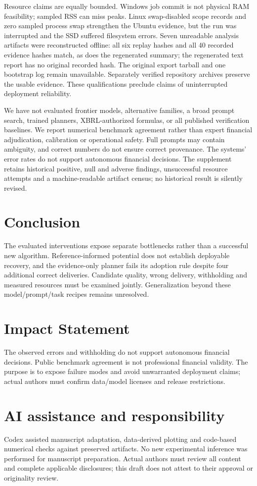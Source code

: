 \documentclass{article}
\begin{document}
Resource claims are equally bounded. Windows job commit is not physical RAM feasibility; sampled RSS can miss peaks. Linux swap-disabled scope records and zero sampled process swap strengthen the Ubuntu evidence, but the run was interrupted and the SSD suffered filesystem errors. Seven unreadable analysis artifacts were reconstructed offline: all six replay hashes and all 40 recorded evidence hashes match, as does the regenerated summary; the regenerated text report has no original recorded hash. The original export tarball and one bootstrap log remain unavailable. Separately verified repository archives preserve the usable evidence. These qualifications preclude claims of uninterrupted deployment reliability.

We have not evaluated frontier models, alternative families, a broad prompt search, trained planners, XBRL-authorized formulas, or all published verification baselines. We report numerical benchmark agreement rather than expert financial adjudication, calibration or operational safety. Full prompts may contain ambiguity, and correct numbers do not ensure correct provenance. The systems' error rates do not support autonomous financial decisions. The supplement retains historical positive, null and adverse findings, unsuccessful resource attempts and a machine-readable artifact census; no historical result is silently revised.

\section{Conclusion}The evaluated interventions expose separate bottlenecks rather than a successful new algorithm. Reference-informed potential does not establish deployable recovery, and the evidence-only planner fails its adoption rule despite four additional correct deliveries. Candidate quality, wrong delivery, withholding and measured resources must be examined jointly. Generalization beyond these model/prompt/task recipes remains unresolved.

\section*{Impact Statement}
The observed errors and withholding do not support autonomous financial decisions. Public benchmark agreement is not professional financial validity. The purpose is to expose failure modes and avoid unwarranted deployment claims; actual authors must confirm data/model licenses and release restrictions.
\section*{AI assistance and responsibility}
Codex assisted manuscript adaptation, data-derived plotting and code-based numerical checks against preserved artifacts. No new experimental inference was performed for manuscript preparation. Actual authors must review all content and complete applicable disclosures; this draft does not attest to their approval or originality review.
\label{main-content-end}


\clearpage\appendix\onecolumn
\end{document}
